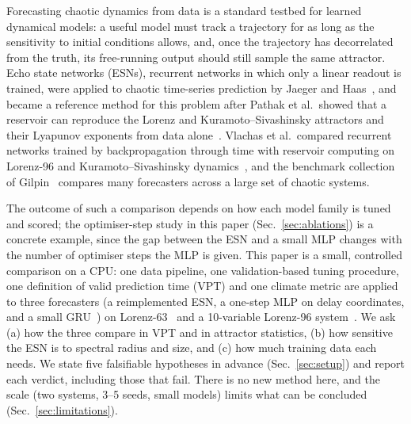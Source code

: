 Forecasting chaotic dynamics from data is a standard testbed for learned dynamical models: a useful model must track a trajectory for as long as the sensitivity to initial conditions allows, and, once the trajectory has decorrelated from the truth, its free-running output should still sample the same attractor. Echo state networks (ESNs), recurrent networks in which only a linear readout is trained, were applied to chaotic time-series prediction by Jaeger and Haas~\cite{jaeger2004harnessing}, and became a reference method for this problem after Pathak et al.\ showed that a reservoir can reproduce the Lorenz and Kuramoto--Sivashinsky attractors and their Lyapunov exponents from data alone~\cite{pathak2017using}. Vlachas et al.\ compared recurrent networks trained by backpropagation through time with reservoir computing on Lorenz-96 and Kuramoto--Sivashinsky dynamics~\cite{vlachas2020backpropagation}, and the benchmark collection of Gilpin~\cite{gilpin2021chaos,gilpin2023model} compares many forecasters across a large set of chaotic systems.

The outcome of such a comparison depends on how each model family is tuned and scored; the optimiser-step study in this paper (Sec.~\ref{sec:ablations}) is a concrete example, since the gap between the ESN and a small MLP changes with the number of optimiser steps the MLP is given. This paper is a small, controlled comparison on a CPU: one data pipeline, one validation-based tuning procedure, one definition of valid prediction time (VPT) and one climate metric are applied to three forecasters (a reimplemented ESN, a one-step MLP on delay coordinates, and a small GRU~\cite{cho2014learning}) on Lorenz-63~\cite{lorenz1963deterministic} and a 10-variable Lorenz-96 system~\cite{lorenz1998optimal}. We ask (a) how the three compare in VPT and in attractor statistics, (b) how sensitive the ESN is to spectral radius and size, and (c) how much training data each needs. We state five falsifiable hypotheses in advance (Sec.~\ref{sec:setup}) and report each verdict, including those that fail. There is no new method here, and the scale (two systems, 3--5 seeds, small models) limits what can be concluded (Sec.~\ref{sec:limitations}).
